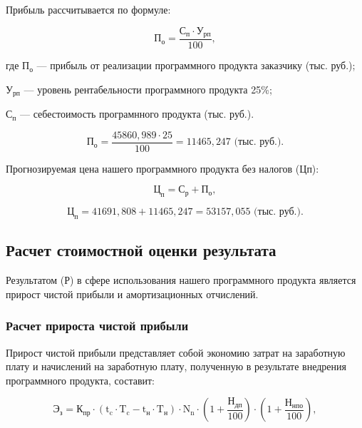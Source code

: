 Прибыль рассчитывается по формуле:

\begin{displaymath}
  \text{П}_{\text{о}} = \frac{\text{С}_{\text{п}} \cdot \text{У}_{\text{рп}}}{100},
\end{displaymath}

где \(\text{П}_{\text{о}}\) --- прибыль от реализации программного продукта заказчику (тыс. руб.);

\(\text{У}_{\text{рп}}\) --- уровень рентабельности программного продукта 25\%; 

\(\text{С}_{\text{п}}\) --- себестоимость програмнного продукта (тыс. руб.).

\begin{displaymath}
  \text{П}_{\text{о}} = \frac{45860,989 \cdot 25}{100} = 11465,247 \text{ (тыс. руб.)}.
\end{displaymath}

Прогнозируемая цена нашего программного продукта без налогов (Цп): 

\begin{displaymath}
  \text{Ц}_{\text{п}} = \text{С}_{\text{р}} + \text{П}_{\text{о}},
\end{displaymath}

\begin{displaymath}
  \text{Ц}_{\text{п}} = 41691,808+11465,247 = 53157,055 \text{ (тыс. руб.)}.
\end{displaymath}

\subsection{Расчет стоимостной оценки результата}

Результатом (Р) в сфере использования нашего программного продукта является прирост чистой прибыли и амортизационных отчислений.

\subsubsection{Расчет прироста чистой прибыли}

Прирост чистой прибыли представляет собой экономию затрат на заработную плату и начислений на заработную плату, полученную в результате внедрения программного продукта, составит:

\begin{displaymath}
  \text{Э}_{\text{з}} = \text{К}_{\text{пр}}\cdot(\text{t}_{\text{c}}\cdot\text{T}_{\text{c}}-\text{t}_{\text{н}}\cdot\text{T}_{\text{н}})\cdot\text{N}_{\text{n}}\cdot
  (1+\frac{\text{Н}_{\text{дп}}}{100})\cdot(1+\frac{\text{Н}_{\text{нпо}}}{100}),
\end{displaymath}

